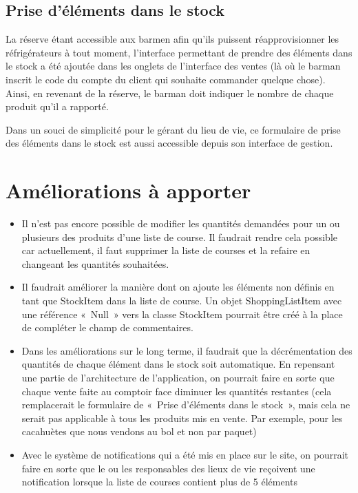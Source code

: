 \documentclass[a4paper]{report}
\begin{document}
\subsection{Prise d’éléments dans le stock}
\par La réserve étant accessible aux barmen afin qu’ils puissent réapprovisionner les réfrigérateurs à tout moment, l’interface permettant de prendre des éléments dans le stock a été ajoutée dans les onglets de l’interface des ventes (là où le barman inscrit le code du compte du client qui souhaite commander quelque chose). Ainsi, en revenant de la réserve, le barman doit indiquer le nombre de chaque produit qu’il a rapporté.
\par Dans un souci de simplicité pour le gérant du lieu de vie, ce formulaire de prise des éléments dans le stock est aussi accessible depuis son interface de gestion.


\section{Améliorations à apporter}
\label{sec:amelioration_a_apporter}

\begin{itemize}
    \item Il n’est pas encore possible de modifier les quantités demandées pour un ou plusieurs des produits d’une liste de course. Il faudrait rendre cela possible car actuellement, il faut supprimer la liste de courses et la refaire en changeant les quantités souhaitées.
    \item Il faudrait améliorer la manière dont on ajoute les éléments non définis en tant que StockItem dans la liste de course. Un objet ShoppingListItem avec une référence « Null » vers la classe StockItem pourrait être créé à la place de compléter le champ de commentaires.
    \item Dans les améliorations sur le long terme, il faudrait que la décrémentation des quantités de chaque élément dans le stock soit automatique. En repensant une partie de l’architecture de l’application, on pourrait faire en sorte que chaque vente faite au comptoir face diminuer les quantités restantes (cela remplacerait le formulaire de « Prise d’éléments dans le stock », mais cela ne serait pas applicable à tous les produits mis en vente. Par exemple, pour les cacahuètes que nous vendons au bol et non par paquet)
    \item Avec le système de notifications qui a été mis en place sur le site, on pourrait faire en sorte que le ou les responsables des lieux de vie reçoivent une notification lorsque la liste de courses contient plus de 5 éléments
\end{itemize}
\end{document}
